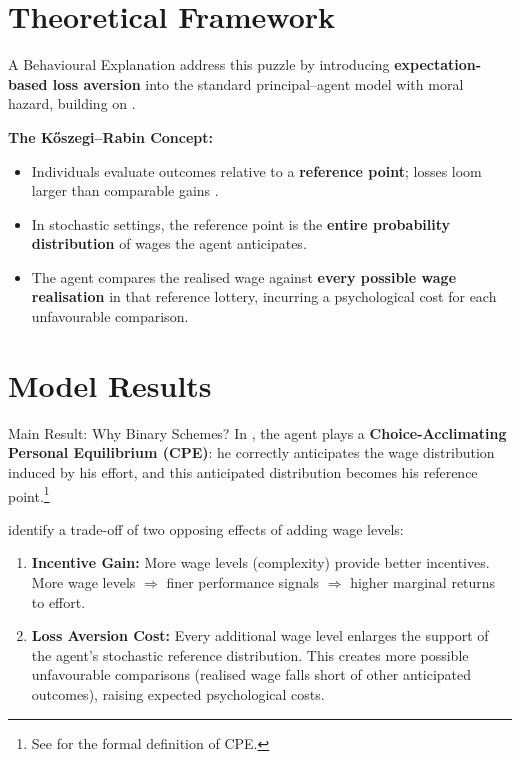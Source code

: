 \documentclass{beamer}
\begin{document}
\section{Theoretical Framework}
\begin{frame}{A Behavioural Explanation}
    \textcite{Herweg2010} address this puzzle by introducing \textbf{expectation-based loss aversion} into the standard principal--agent model with moral hazard, building on \textcite{Koszegi2006}.

    \medskip

    \textbf{The K\H{o}szegi--Rabin Concept:}

    \smallskip
    
    \begin{itemize}
    \setlength{\itemsep}{10pt}
        \item Individuals evaluate outcomes relative to a \textbf{reference point}; losses loom larger than comparable gains \parencite{Kahneman1979}.
        \item In stochastic settings, the reference point is the \textbf{entire probability distribution} of wages the agent anticipates.
        \item The agent compares the realised wage against \textbf{every possible wage realisation} in that reference lottery, incurring a psychological cost for each unfavourable comparison.
    \end{itemize}
\end{frame}

\section{Model Results}
\begin{frame}{Main Result: Why Binary Schemes?}
    In \textcite{Herweg2010}, the agent plays a \textbf{Choice-Acclimating Personal Equilibrium (CPE)}: he correctly anticipates the wage distribution induced by his effort, and this anticipated distribution becomes his reference point.\footnote{See \textcite{koszegi2007} for the formal definition of CPE.}
    
    \medskip
    
    \textcite{Herweg2010} identify a trade-off of two opposing effects of adding wage levels:
    
    \medskip
    
    \begin{enumerate}
        \item \textbf{Incentive Gain:} More wage levels (complexity) provide better incentives. More wage levels $\Rightarrow$ finer performance signals $\Rightarrow$ higher marginal returns to effort.
        \item \textbf{Loss Aversion Cost:}  Every additional wage level enlarges the support of the agent’s stochastic reference distribution. This creates more possible unfavourable comparisons (realised wage falls short of other anticipated outcomes), raising expected psychological costs.
    \end{enumerate}
\end{frame}
\end{document}
